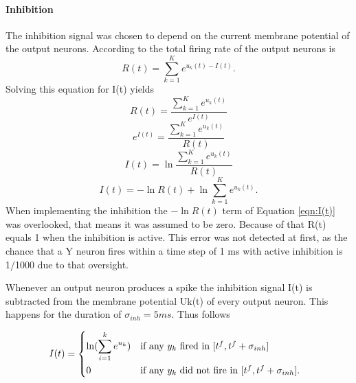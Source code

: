 \paragraph{Inhibition}
The inhibition signal was chosen to depend on the current membrane potential of the output neurons. According to \citet{nessler} the total firing rate of the output neurons is
\begin{equation}
\label{eqn:R}
R(t) = \sum_{k=1}^K e^{u_k(t) - I(t)}.
\end{equation}
Solving this equation for I(t) yields
\begin{equation}
\label{}
R(t) = \frac{ \sum_{k=1}^K e^{u_k(t)}}{e^{I(t)}}
\end{equation}
\begin{equation}
\label{}
e^{I(t)} = \frac{\sum_{k=1}^K e^{u_k(t)}}{R(t)}
\end{equation}
\begin{equation}
\label{}
I(t) = \ln{ \frac{ \sum_{k=1}^K e^{u_k(t)}}{R(t)}}
\end{equation}
\begin{equation}
\label{eqn:I(t)}
I(t) =  - \ln{R(t)} + \ln{  \sum_{k=1}^K e^{u_k(t)}}.
\end{equation}
When implementing the inhibition the $- \ln{R(t)}$ term of Equation \ref{eqn:I(t)} was overlooked, that means it was assumed to be zero. Because of that R(t) equals 1 when the inhibition is active. This error was not detected at first, as the chance that a Y neuron fires within a time step of 1 ms with active inhibition is 1/1000 due to that oversight.

Whenever an output neuron produces a spike the inhibition signal I(t) is subtracted from the membrane potential Uk(t) of every output neuron. This happens for the duration of $\sigma_{inh} = 5 ms$. Thus follows

\begin{equation}
\label{eqn:iinh}
I(t) = \begin{dcases*} \ln ( \sum_{i=1}^k e^{u_k} ) & if any $y_k$ fired in $ [t^f, t^f  + \sigma_{inh}] $ \\
0 & \text{if any $y_k$ did not fire in $ [t^f, t^f + \sigma_{inh}] $. } \end{dcases*}\end{equation}

